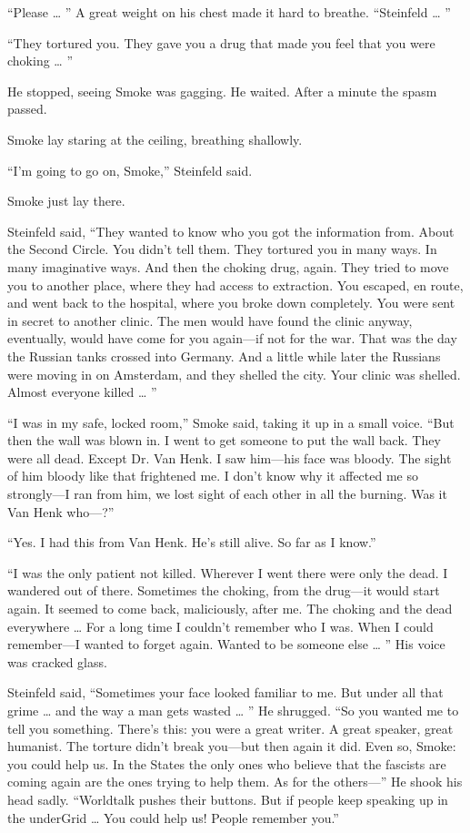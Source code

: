 “Please … ” A great weight on his chest made it hard to breathe. “Steinfeld … ”

“They tortured you. They gave you a drug that made you feel that you were choking … ”

He stopped, seeing Smoke was gagging. He waited. After a minute the spasm passed.

Smoke lay staring at the ceiling, breathing shallowly.

“I’m going to go on, Smoke,” Steinfeld said.

Smoke just lay there.

Steinfeld said, “They wanted to know who you got the information from. About the Second Circle. You didn’t tell them. They tortured you in many ways. In many imaginative ways. And then the choking drug, again. They tried to move you to another place, where they had access to extraction. You escaped, en route, and went back to the hospital, where you broke down completely. You were sent in secret to another clinic. The men would have found the clinic anyway, eventually, would have come for you again—if not for the war. That was the day the Russian tanks crossed into Germany. And a little while later the Russians were moving in on Amsterdam, and they shelled the city. Your clinic was shelled. Almost everyone killed … ”

“I was in my safe, locked room,” Smoke said, taking it up in a small voice. “But then the wall was blown in. I went to get someone to put the wall back. They were all dead. Except Dr. Van Henk. I saw him—his face was bloody. The sight of him bloody like that frightened me. I don’t know why it affected me so strongly—I ran from him, we lost sight of each other in all the burning. Was it Van Henk who—?”

“Yes. I had this from Van Henk. He’s still alive. So far as I know.”

“I was the only patient not killed. Wherever I went there were only the dead. I wandered out of there. Sometimes the choking, from the drug—it would start again. It seemed to come back, maliciously, after me. The choking and the dead everywhere … For a long time I couldn’t remember who I was. When I could remember—I wanted to forget again. Wanted to be someone else … ” His voice was cracked glass.

Steinfeld said, “Sometimes your face looked familiar to me. But under all that grime … and the way a man gets wasted … ” He shrugged. “So you wanted me to tell you something. There’s this: you were a great writer. A great speaker, great humanist. The torture didn’t break you—but then again it did. Even so, Smoke: you could help us. In the States the only ones who believe that the fascists are coming again are the ones trying to help them. As for the others—” He shook his head sadly. “Worldtalk pushes their buttons. But if people keep speaking up in the underGrid … You could help us! People remember you.”

